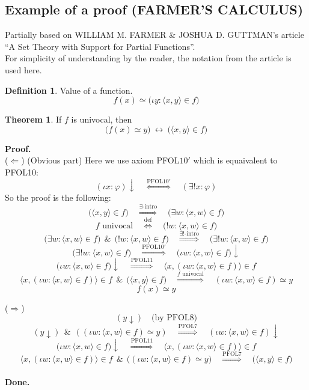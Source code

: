 \documentclass[10pt,a4paper]{article}
\theoremstyle{definition}
\newtheorem{definition}{Definition}[section]
\newtheorem{theorem}{Theorem}[section]
\newcommand{\AND}{\ \ \&\ \ }
\newcommand{\Done}{\noindent \textbf{Done.}\\}
\renewcommand{\iff}{\ \longleftrightarrow\ }
\newcommand{\Proof}{\noindent \textbf{Proof.}\\}
\begin{document}
\subsection{Example of a proof (FARMER'S CALCULUS)}
Partially based on WILLIAM M. FARMER \& JOSHUA D. GUTTMAN's article\\
``A Set Theory with Support for Partial Functions''.\\
For simplicity of understanding by the reader, the notation from the article is used here.\\
\begin{definition} Value of a function.
\[
f(x) \simeq \big(\iota y: \langle x,y\rangle\in f\big)
\]
\end{definition}

\begin{theorem} If $f$ is univocal, then
\[
\big(f(x)\simeq y\big)\iff \big(\langle x,y\rangle\in f\big)
\]
\end{theorem}
\Proof
($\Leftarrow$) (Obvious part) Here we use axiom PFOL$10'$ which is equaivalent to PFOL10:
\[
(\iota x:\varphi)\downarrow
\quad\overset{\mbox{PFOL10}'}{\Longleftrightarrow}\quad
(\exists!x:\varphi)
\]
So the proof is the following:
\[
\big(\langle x,y\rangle\in f\big)
\quad\overset{\exists\mbox{-intro}}{\Longrightarrow}\quad
\big(\exists w: \langle x,w\rangle\in f\big)
\]
\[
f\mbox{ univocal}
\quad\overset{\mbox{def}}{\Longleftrightarrow}\quad
\big(! w: \langle x,w\rangle\in f\big)
\]
\[
\big(\exists w: \langle x,w\rangle\in f\big)
\AND
\big(! w: \langle x,w\rangle\in f\big)
\quad\overset{\exists!\mbox{-intro}}{\Longrightarrow}\quad
\big(\exists! w: \langle x,w\rangle\in f\big)
\]
\[
\big(\exists! w: \langle x,w\rangle\in f\big)
\quad\overset{\mbox{PFOL10}'}{\Longrightarrow}\quad
\big(\iota w: \langle x,w\rangle\in f\big)\downarrow
\]
\[
\big(\iota w: \langle x,w\rangle\in f\big)\downarrow 
\quad\overset{\mbox{PFOL11}}{\Longrightarrow}\quad
\langle x,(\iota w: \langle x,w\rangle\in f)\rangle\in f
\]
\[
\langle x,(\iota w: \langle x,w\rangle\in f)\rangle\in f
\AND
\big(\langle x,y\rangle\in f\big)
\quad\overset{f \mbox{ univocal}}{\Longrightarrow}\quad
(\iota w: \langle x,w\rangle\in f) \simeq y
\]
\[
f(x) \simeq y
\]

\noindent($\Rightarrow$)
\[(y\downarrow)\quad\mbox{(by PFOL8)}\]
\[
(y\downarrow)\AND((\iota w: \langle x,w\rangle\in f)\simeq y) \quad\overset{\mbox{PFOL7}}{\Longrightarrow}\quad
(\iota w: \langle x,w\rangle\in f)\downarrow \]
\[
\big(\iota w: \langle x,w\rangle\in f\big)\downarrow 
\quad\overset{\mbox{PFOL11}}{\Longrightarrow}\quad
\langle x,(\iota w: \langle x,w\rangle\in f)\rangle\in f
\]
\[
\langle x,(\iota w: \langle x,w\rangle\in f)\rangle\in f
\AND
\big((\iota w: \langle x,w\rangle\in f)\simeq y\big)
\quad\overset{\mbox{PFOL7}}{\Longrightarrow}\quad
\big(\langle x, y\rangle\in f\big)
\]
\\
\Done
\pagebreak
\iffalse
\end{document}
